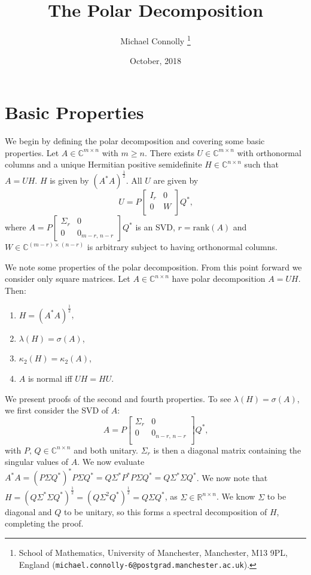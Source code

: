 \documentclass[12pt]{article}
\title{The Polar Decomposition}
\author{Michael Connolly%
        \thanks{%
                School of Mathematics,
                University of Manchester,
                Manchester, M13 9PL, England
                (\texttt{michael.connolly-6@postgrad.manchester.ac.uk}).
               }
}
\date{October, 2018}
\def\R{\mathbb{R}}
\def\C{\mathbb{C}}
\def\nbyn{n \times n}
\def\mbyn{m \times n}
\begin{document}
\maketitle

\section{Basic Properties}

We begin by defining the polar decomposition and covering some basic properties.
Let $A \in \C^{\mbyn}$ with $m \ge n$. There exists $U \in \C^{\mbyn}$ with
orthonormal columns and a unique Hermitian positive semidefinite
$H \in \C^{\nbyn}$ such that $A=UH$. $H$ is given by $(A^{*}A)^{\frac{1}{2}}$.
All $U$ are given by
\begin{equation}
  U=P
  \begin{bmatrix}
    I_r & 0 \\
    0 & W \\
  \end{bmatrix}
  Q^*\text{,}
\end{equation}
where $A = P \begin{bmatrix} \Sigma_r & 0 \\ 0 & 0_{m-r\text{, } n-r}\end{bmatrix} Q^*$
is an SVD, $r=\mathrm{rank}(A)$ and $W \in \C^{(m-r)\times (n-r)}$ is arbitrary subject
to having orthonormal columns.

We note some properties of the polar decomposition.
From this point forward we consider only square matrices.
Let $A \in \C^{\nbyn}$
have polar decomposition $A=UH$. Then:
\begin{enumerate}
\item $H=(A^*A)^{\frac{1}{2}}$,
\item $\lambda (H) = \sigma(A)$,
\item $\kappa_2(H) = \kappa_2(A)$,
\item $A$ is normal iff $UH=HU$.
\end{enumerate}

We present proofs of the second and fourth properties.
To see $\lambda(H) = \sigma(A)$, we first consider the SVD of $A$:
\begin{equation}
  A = P
  \begin{bmatrix}
    \Sigma_r & 0 \\
    0 & 0_{n-r\text{, }n-r} \\	
  \end{bmatrix} Q^*\text{,}
\end{equation}
with $P\text{, } Q \in \C^{\nbyn}$ and both unitary. $\Sigma_r$ is then a
diagonal matrix containing the singular values of $A$. We now evaluate
$A^*A = (P\Sigma Q^*)^*P\Sigma Q^* = Q\Sigma^* P^* P\Sigma Q^* = Q \Sigma^*
\Sigma Q^*$. We now note that
$H = ( Q \Sigma^* \Sigma Q^*)^{\frac{1}{2}} = ( Q \Sigma^2 Q^*)^{\frac{1}{2}}= Q
\Sigma Q^*$, as $\Sigma \in \R^{\nbyn}$. We know $\Sigma$ to be diagonal and $Q$
to be unitary, so this forms a spectral decomposition of $H$, completing the
proof.
\end{document}
